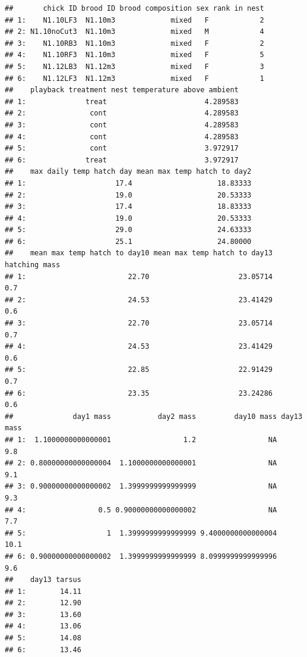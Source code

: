 \documentclass[]{book}
\begin{document}
\begin{verbatim}
##       chick ID brood ID brood composition sex rank in nest
## 1:    N1.10LF3  N1.10m3             mixed   F            2
## 2: N1.10noCut3  N1.10m3             mixed   M            4
## 3:    N1.10RB3  N1.10m3             mixed   F            2
## 4:    N1.10RF3  N1.10m3             mixed   F            5
## 5:    N1.12LB3  N1.12m3             mixed   F            3
## 6:    N1.12LF3  N1.12m3             mixed   F            1
##    playback treatment nest temperature above ambient
## 1:              treat                       4.289583
## 2:               cont                       4.289583
## 3:               cont                       4.289583
## 4:               cont                       4.289583
## 5:               cont                       3.972917
## 6:              treat                       3.972917
##    max daily temp hatch day mean max temp hatch to day2
## 1:                     17.4                    18.83333
## 2:                     19.0                    20.53333
## 3:                     17.4                    18.83333
## 4:                     19.0                    20.53333
## 5:                     29.0                    24.63333
## 6:                     25.1                    24.80000
##    mean max temp hatch to day10 mean max temp hatch to day13 hatching mass
## 1:                        22.70                     23.05714           0.7
## 2:                        24.53                     23.41429           0.6
## 3:                        22.70                     23.05714           0.7
## 4:                        24.53                     23.41429           0.6
## 5:                        22.85                     22.91429           0.7
## 6:                        23.35                     23.24286           0.6
##              day1 mass           day2 mass         day10 mass day13 mass
## 1:  1.1000000000000001                 1.2                 NA        9.8
## 2: 0.80000000000000004  1.1000000000000001                 NA        9.1
## 3: 0.90000000000000002  1.3999999999999999                 NA        9.3
## 4:                 0.5 0.90000000000000002                 NA        7.7
## 5:                   1  1.3999999999999999 9.4000000000000004       10.1
## 6: 0.90000000000000002  1.3999999999999999 8.0999999999999996        9.6
##    day13 tarsus
## 1:        14.11
## 2:        12.90
## 3:        13.60
## 4:        13.06
## 5:        14.08
## 6:        13.46
\end{verbatim}
\end{document}

